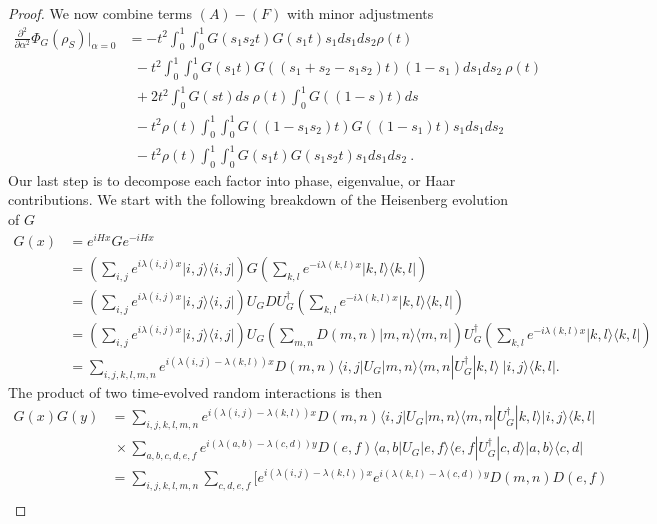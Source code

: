 \documentclass{article}
\newcommand{\ket}[1]{|#1\rangle}
\newcommand{\bra}[1]{\langle #1|}
\newcommand{\ketbra}[2]{| #1\rangle\! \langle #2|}
\newcommand{\parens}[1]{\left( #1 \right)}
\begin{document}
\begin{proof}
We now combine terms $(A) - (F)$ with minor adjustments 
\begin{align}
    \frac{\partial^2}{\partial \alpha^2} \Phi_G(\rho_S) \bigg|_{\alpha = 0} &= -t^2 \int_0^1 \int_0^1 G(s_1 s_2 t) G(s_1 t) s_1 ds_1 ds_2 \rho(t) \\
    &~ ~ -t^2 \int_0^1 \int_0^1 G(s_1 t) G((s_1 + s_2 - s_1 s_2)t) (1-s_1) ds_1 ds_2 ~ \rho(t) \\
    &~ ~ + 2 t^2 \int_0^1 G(st) ds ~ \rho(t) \int_0^1 G((1-s)t) ds \\
    & ~ ~ -t^2 \rho(t) \int_0^1 \int_0^1 G((1- s_1 s_2) t) G((1-s_1)t) s_1 ds_1 ds_2 \\
    & ~ ~ -t^2 \rho(t) \int_0^1 \int_0^1 G(s_1 t) G(s_1 s_2 t) s_1 ds_1 ds_2 ~ .
\end{align}
Our last step is to decompose each factor into phase, eigenvalue, or Haar contributions. We start with the following breakdown of the Heisenberg evolution of $G$
\begin{align}
    G(x) &= e^{i H x} G e^{-i H x} \\
    &= \parens{\sum_{i,j} e^{i \lambda(i,j) x} \ketbra{i,j}{i, j}} G \parens{\sum_{k,l} e^{-i \lambda(k,l) x} \ketbra{k, l}{k, l}} \\
    &= \parens{\sum_{i,j} e^{i \lambda(i,j) x} \ketbra{i,j}{i, j}} U_G D U_G^\dagger \parens{\sum_{k,l} e^{-i \lambda(k,l) x} \ketbra{k, l}{k, l}} \\
    &= \parens{\sum_{i,j} e^{i \lambda(i,j) x} \ketbra{i,j}{i, j}} U_G \parens{ \sum_{m, n} D(m,n) \ketbra{m,n}{m,n}} U_G^\dagger \parens{\sum_{k,l} e^{-i \lambda(k,l) x} \ketbra{k, l}{k, l}} \\
    &= \sum_{i,j,k,l,m,n} e^{i (\lambda(i,j) - \lambda(k,l))x} D(m,n) \bra{i,j} U_G \ket{m,n} \bra{m,n} U_G^\dagger \ket{k,l} ~\ketbra{i,j}{k,l}.
\end{align}
The product of two time-evolved random interactions is then 
\begin{align}
    G(x) G(y) &= \sum_{i,j,k,l,m,n} e^{i (\lambda(i,j) - \lambda(k,l))x} D(m,n) \bra{i,j} U_G \ket{m,n} \bra{m,n} U_G^\dagger \ket{k,l} \ketbra{i,j}{k,l} \nonumber \\
    &~ \times \sum_{a,b,c,d,e,f} e^{i(\lambda(a,b) - \lambda(c,d))y} D(e,f) \bra{a,b} U_G \ket{e,f} \bra{e,f} U_G^\dagger \ket{c,d} \ketbra{a,b}{c,d} \\ 
    &= \sum_{i,j,k,l,m,n} \sum_{c,d,e,f} \bigg[ e^{i(\lambda(i,j) - \lambda(k,l))x} e^{i(\lambda(k,l) - \lambda(c,d))y} D(m,n) D(e,f) \nonumber \\

\end{align}
\end{proof}
\end{document}
